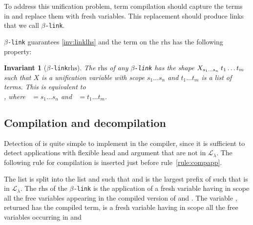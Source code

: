 \documentclass[sigconf,natbib=false,review]{acmart}
\newtheorem{invariant}{Invariant}
\newcommand{\appsep}{\ensuremath{\textcolor{lightgray}{\cdot}}}
\newcommand{\llambda}{\ensuremath{\mathcal{L}_\lambda}\xspace}
\newcommand{\linkMacro}[1]{\ensuremath{#1}\texttt{-link}\xspace}
\newcommand{\linkbeta}{\linkMacro{\beta}}
\newcommand{\linkbetaM}[3]{\ensuremath{#1 \vdash #2 =_\beta #3}}
\newcommand{\rhs}{\ensuremath{\mathrm{rhs}}\xspace}
\newcommand{\linkStore}{\ensuremath{\mathbb{L}}\xspace}
\begin{document}
To address
this unification problem, term compilation should capture the
terms in \notllambda and replace them with fresh variables.
This replacement should produce links that we call \linkbeta.

\linkbeta guarantees \cref{inv:linklhs} and the term on the \rhs has the
following property:

\newcommand{\rhsBetaHead}{\ensuremath{X_{s_1\dots s_n}}}
\newcommand{\rhsBeta}{\ensuremath{\rhsBetaHead\appsep t_1\dots t_m}\xspace}

\begin{invariant}[\linkbeta \rhs]
  The \rhs of any \linkbeta has the shape \rhsBeta such that $X$ is a
  unification variable with scope $s_1\dots s_n$ and $t_1\dots t_m$ is a list of
  terms. This is equivalent to \\, where ~$=
  s_1\dots s_n$ and ~$=t_1\dots t_m$.
  \label{inv:beta-rhs}
\end{invariant}





\subsection{Compilation and decompilation}

Detection of \notllambda is quite simple to implement in the compiler, since it
is sufficient to detect applications with flexible head and argument that
are not in \llambda. The following rule for \notllambda compilation is inserted 
just before rule~\ref{rule:compapp}.




The list  is split into the list  and  such
that  and  is the largest prefix of
 such that  is in \llambda. The \rhs of the \linkbeta is
the application of a fresh variable  having in scope all the free
variables appearing in the compiled version of  and . The
variable , returned has the compiled term, is a fresh variable having in
scope all the free variables occurring in  and 
\end{document}
